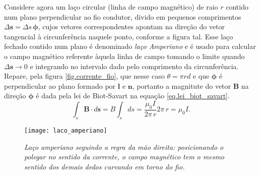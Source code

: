 Considere agora um laço circular (linha de campo magnético) de raio $r$ contido num plano perpendicular ao fio condutor, divido em pequenos comprimentos $\Delta\textbf{s}=\Delta s\,\pmb{\phi}$, cujos vetores correspondentes apontam na direção do vetor tangencial à circunferência naquele ponto, conforme  a figura tal. Esse laço fechado contido num plano é denominado \textit{laço Amperiano} e é usado para calcular o campo magnético referente àquela linha de campo tomando o limite quando $\Delta\textbf{s}\to 0$ e integrando no intervalo dado pelo comprimento da circunferência. Repare, pela figura \ref{fig.corrente_fio}, que nesse caso $\theta=\pi rd$ e que $\pmb{\phi}$ é perpendicular ao plano formado por $\textbf{l}$ e $\textbf{n}$, portanto a magnitute do vetor  $\textbf{B}$ na direção $\pmb{\phi}$ é dada pela lei de Biot-Savart na equação \ref{eq.lei_biot_savart}.
\begin{equation*}
\int_{s}\textbf{B}\cdot d\textbf{s}=B\int_{s}ds=\frac{\mu_0I}{2\pi\,r}2\pi\,r=\mu_0I.
\end{equation*} 
\begin{figure}[h]
\centering
\texttt{[image: laco\_amperiano]}
\caption{\textit{Laço amperiano seguindo a regra da mão direita: posicionando o polegar no sentido da corrente, o campo magnético tem o mesmo sentido dos demais dedos curvando em torno do fio.}}
\label{fig.laco_amperiano}
\end{figure}

